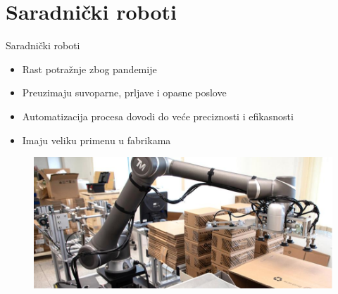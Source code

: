 \documentclass{beamer}
\begin{document}
\section{Saradnički roboti}
\begin{frame}{Saradnički roboti}
    \begin{itemize}
        \item Rast potražnje zbog pandemije
        \item Preuzimaju suvoparne, prljave i opasne poslove
        \item Automatizacija procesa dovodi do veće preciznosti i efikasnosti 
        \item Imaju veliku primenu u fabrikama 
    \end{itemize}
    \begin{figure}
        \centering
        \includegraphics[scale=0.25]{Cobot.jpg}
    \end{figure}
\end{frame}
\end{document}
